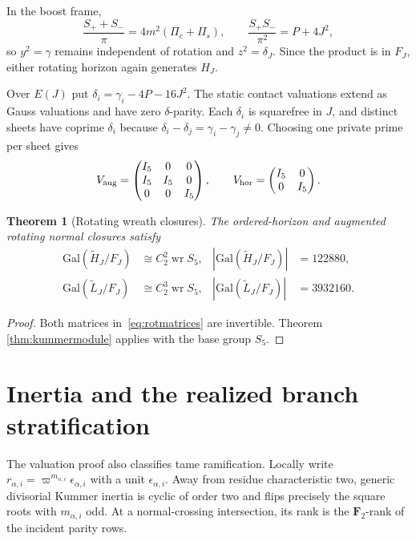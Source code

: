 \documentclass[11pt]{article}
\newtheorem{theorem}{Theorem}[section]
\theoremstyle{definition}
\theoremstyle{remark}
\newcommand{\Gal}{\mathrm{Gal}}
\newcommand{\wrp}{\mathop{\mathrm{wr}}}
\begin{document}
In the boost frame,
\begin{equation}
\frac{S_++S_-}{\pi}=4m^2(\Pi_c+\Pi_s),\qquad
\frac{S_+S_-}{\pi^2}=P+4J^2,
\label{eq:rotentropy}
\end{equation}
so $y^2=\gamma$ remains independent of rotation and $z^2=\delta_J$. Since
the product is in $F_J$, either rotating horizon again generates $H_J$.

Over $E(J)$ put $\delta_i=\gamma_i-4P-16J^2$.  The static contact valuations
extend as Gauss valuations and have zero $\delta$-parity. Each $\delta_i$ is
squarefree in $J$, and distinct sheets have coprime $\delta_i$ because
$\delta_i-\delta_j=\gamma_i-\gamma_j\ne0$. Choosing one private prime per
sheet gives
\begin{equation}
V_{\rm aug}=\begin{pmatrix}I_5&0&0\\I_5&I_5&0\\0&0&I_5\end{pmatrix},
\qquad
V_{\rm hor}=\begin{pmatrix}I_5&0\\0&I_5\end{pmatrix}.
\label{eq:rotmatrices}
\end{equation}

\begin{theorem}[Rotating wreath closures]
\label{thm:rotwreath}
The ordered-horizon and augmented rotating normal closures satisfy
\begin{align}
\Gal(\widetilde H_J/F_J)&\cong C_2^2\wrp S_5,
&|\Gal(\widetilde H_J/F_J)|&=122880,\\
\Gal(\widetilde L_J/F_J)&\cong C_2^3\wrp S_5,
&|\Gal(\widetilde L_J/F_J)|&=3932160.
\end{align}
\end{theorem}

\begin{proof}
Both matrices in~\eqref{eq:rotmatrices} are invertible.  Theorem
\ref{thm:kummermodule} applies with the base group $S_5$.
\end{proof}

\section{Inertia and the realized branch stratification}
\label{sec:inertia}

The valuation proof also classifies tame ramification.  Locally write
$r_{\alpha,i}=\varpi^{m_{\alpha,i}}\epsilon_{\alpha,i}$ with a unit
$\epsilon_{\alpha,i}$.  Away from residue characteristic two, generic
divisorial Kummer inertia is cyclic of order two and flips precisely the
square roots with $m_{\alpha,i}$ odd.  At a normal-crossing intersection, its
rank is the $\mathbf F_2$-rank of the incident parity rows.
\end{document}
